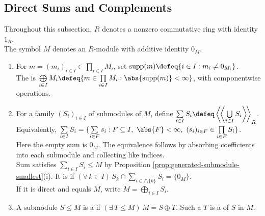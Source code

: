 \subsection{Direct Sums and Complements}

Throughout this subsection, $R$ denotes a nonzero commutative ring with identity $1_R$.\\
The symbol $M$ denotes an $R$-module with additive identity $0_M$.

\begin{definition} \label{def:module-direct-sums} 
\begin{enumerate}[label=(\roman*)]
\setlength{\itemsep}{0pt}
\item For $m=(m_i)_{i\in I}\in\prod\limits_{i\in I}M_i$, set $\operatorname{supp}(m)\defeq\{i\in I:m_i\neq0_{M_i}\}$.\\
The  is $\bigoplus\limits_{i\in I}M_i\defeq\{m\in\prod\limits_{i\in I}M_i:\abs{\operatorname{supp}(m)}<\infty\}$, with componentwise operations.
\item For a family $(S_i)_{i\in I}$ of submodules of $M$, define $\sum\limits_{i\in I}S_i\defeq\left\langle\!\left\langle\bigcup\limits_{i\in I}S_i\right\rangle\!\right\rangle_R$.\\
Equivalently, $\sum\limits_{i\in I}S_i=\{\sum\limits_{i\in F}s_i:F\subseteq I,\ \abs{F}<\infty,\ (s_i)_{i\in F}\in\prod\limits_{i\in F}S_i\}$.\\
Here the empty sum is $0_M$. The equivalence follows by absorbing coefficients into each submodule and collecting like indices.\\
Sum satisfies $\sum\limits_{i\in I}S_i\leq M$ by Proposition \ref{prop:generated-submodule-smallest}(i). It is  if $(\forall\,k\in I)\,S_k\cap\sum\limits_{i\in I\setminus\{k\}}S_i=\{0_M\}$.\\
If it is direct and equals $M$, write $M=\bigoplus\limits_{i\in I}S_i$.
\item A submodule $S\leq M$ is a  if $(\exists\,T\leq M)\,M=S\oplus T$. Such a $T$ is a  of $S$ in $M$.
\end{enumerate}
\end{definition}

